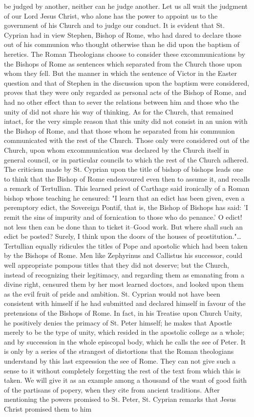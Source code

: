 be judged by another, neither can he judge another. Let us all wait the judgment of our Lord Jesus Christ, who alone has the power to appoint us to the government of his Church and to judge our conduct. It is evident that St. Cyprian had in view Stephen, Bishop of Rome, who had dared to declare those out of his communion who thought otherwise than he did upon the baptism of heretics. The Roman Theologians choose to consider these excommunications by the Bishops of Rome as sentences which separated from the Church those upon whom they fell. But the manner in which the sentence of Victor in the Easter question and that of Stephen in the discussion upon the baptism were considered, proves that they were only regarded as personal acts of the Bishop of Rome, and had no other effect than to sever the relations between him and those who the unity of did not share his way of thinking. As for the Church, that remained intact, for the very simple reason that this unity did not consist in an union with the Bishop of Rome, and that those whom he separated from his communion communicated with the rest of the Church. Those only were considered out of the Church, upon whom excommunication was declared by the Church itself in general council, or in particular councils to which the rest of the Church adhered. The criticism made by St. Cyprian upon the title of bishop of bishops leads one to think that the Bishop of Rome endeavoured even then to assume it, and recalls a remark of Tertullian. This learned priest of Carthage said ironically of a Roman bishop whose teaching he censured: "I learn that an edict has been given, even a peremptory edict, the Sovereign Pontif, that is, the Bishop of Bishops has said: 'I remit the sins of impurity and of fornication to those who do penance.' O edict! not less then can be done than to ticket it--Good work. But where shall such an edict be posted? Surely, I think upon the doors of the houses of prostitution."… Tertullian equally ridicules the titles of Pope and apostolic which had been taken by the Bishops of Rome. Men like Zephyrinus and Callistus his successor, could well appropriate pompous titles that they did not deserve; but the Church, instead of recognizing their legitimacy, and regarding them as emanating from a divine right, censured them by her most learned doctors, and looked upon them as the evil fruit of pride and ambition. St. Cyprian would not have been consistent with himself if he had submitted and declared himself in favour of the pretensions of the Bishops of Rome. In fact, in his Treatise upon Church Unity, he positively denies the primacy of St. Peter himself; he makes that Apostle merely to be the type of unity, which resided in the apostolic college as a whole; and by succession in the whole episcopal body, which he calls the see of Peter. It is only by a series of the strangest of distortions that the Roman theologians understand by this last expression the see of Rome. They can not give such a sense to it without completely forgetting the rest of the text from which this is taken. We will give it as an example among a thousand of the want of good faith of the partisans of popery, when they cite from ancient traditions. After mentioning the powers promised to St. Peter, St. Cyprian remarks that Jesus Christ promised them to him 